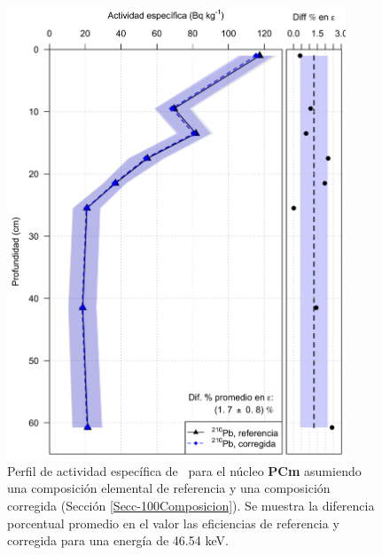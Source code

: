 \begin{figure}
\centering
\includegraphics[width=0.9\textwidth]{Imagenes/Act_210Pb_Agua_Composicion_PCm.png}
\caption{Perfil de actividad específica de \PbCero\, para el núcleo \textbf{PCm} asumiendo una composición elemental de referencia y una composición corregida (Sección \ref{Secc-100Composicion}). Se muestra la diferencia porcentual promedio en el valor las eficiencias de referencia y corregida para una energía de 46.54 keV.}\label{FigPCmAgua}
\end{figure}
